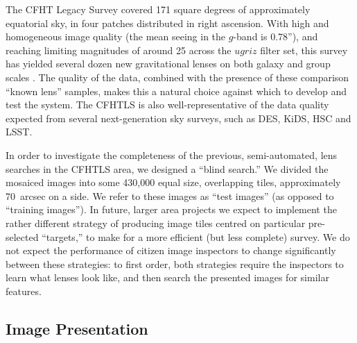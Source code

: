 \documentclass[useAMS,usenatbib,a4paper]{mn2e}
\begin{document}
The CFHT Legacy Survey \citep[CFHTLS,][]{CFHTLS} covered 171 square degrees of
approximately equatorial sky, in four patches distributed in right ascension.
With high and homogeneous image quality (the mean seeing in the $g$-band is
0.78''), and reaching limiting magnitudes of around 25 across the $ugriz$ filter
set, this survey has yielded several dozen new gravitational lenses on both
galaxy and group scales
\citep{GavazziEtal2014,SonnenfeldEtal13,CabanacEtal2007,MoreEtal2012}. The
quality of the data, combined with the presence of these comparison ``known
lens'' samples, makes this a natural choice against which to develop and test
the \SW system. The CFHTLS is also well-representative of the data quality
expected from several next-generation sky surveys, such as DES, KiDS, HSC and
LSST.

In order to investigate the completeness of the previous, semi-automated, lens
searches in the CFHTLS area, we designed a ``blind search.'' We divided the
mosaiced images into some 430,000 equal size, overlapping tiles, approximately
70~arcsec on a side. We refer to these images as ``test images'' (as opposed to
``training images''). In future, larger area projects we expect to implement the
rather different strategy of producing image tiles centred on particular
pre-selected ``targets,'' to make for a more efficient (but less complete)
survey. We do not expect the performance of citizen image inspectors to change
significantly between these strategies: to first order, both strategies require
the inspectors to learn what lenses look like, and then search the presented
images for similar features.



\subsection{Image Presentation}
\label{sec:data:display}
\end{document}
